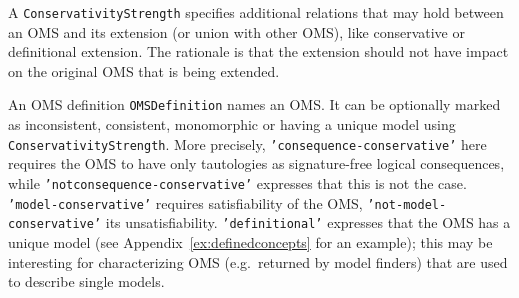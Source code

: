 \documentclass[10pt,fleqn,final]{scrreprt}
\newcommand*{\syntax}[1]{\texttt{#1}}
\newenvironment{definitions}[0]{\medskip }{}
\begin{document}
\begin{definitions}
A \syntax{ConservativityStrength} specifies additional relations that
may hold between an OMS and its extension (or union with other OMS),
like conservative or definitional extension. The rationale is that the
extension should not have impact on the original OMS that is being
extended. 

An OMS definition \syntax{OMSDefinition} names an OMS.  It can be
optionally marked as inconsistent, consistent, monomorphic or having a
unique model using \syntax{ConservativityStrength}. More precisely,
\syntax{'consequence-conservative'} here requires the OMS to have only
tautologies as signature-free logical consequences, while
\syntax{'not\-consequence-conservative'} expresses that this is not
the case.  \syntax{'model-conservative'} requires satisfiability of
the OMS, \syntax{'not-model-conservative'} its unsatisfiability.
\syntax{'de\-fi\-nitional'} expresses that the OMS has a unique
model (see Appendix~\ref{ex:definedconcepts} for an example); this may be interesting for characterizing OMS
(e.g.\ returned by model finders) that are used to describe single
models.


\end{definitions}
\end{document}
